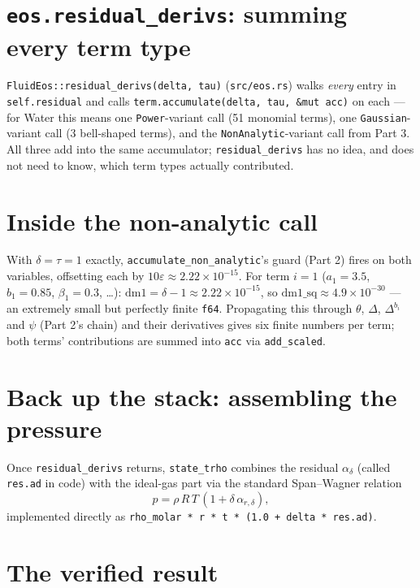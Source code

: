 \documentclass[11pt]{article}
\begin{document}
\section{\texttt{eos.residual\_derivs}: summing every term type}

\texttt{FluidEos::residual\_derivs(delta, tau)} (\texttt{src/eos.rs}) walks
\emph{every} entry in \texttt{self.residual} and calls
\texttt{term.accumulate(delta, tau, \&mut acc)} on each — for Water this
means one \texttt{Power}-variant call (51 monomial terms), one
\texttt{Gaussian}-variant call (3 bell-shaped terms), and the
\texttt{NonAnalytic}-variant call from Part 3. All three add into the same
accumulator; \texttt{residual\_derivs} has no idea, and does not need to
know, which term types actually contributed.

\section{Inside the non-analytic call}

With $\delta=\tau=1$ exactly, \texttt{accumulate\_non\_analytic}'s guard
(Part 2) fires on both variables, offsetting each by $10\varepsilon \approx
2.22\times10^{-15}$. For term $i=1$ ($a_1=3.5$, $b_1=0.85$,
$\beta_1=0.3$, \ldots): $\mathrm{dm1} = \delta - 1 \approx 2.22\times
10^{-15}$, so $\mathrm{dm1\_sq} \approx 4.9\times10^{-30}$ — an extremely
small but perfectly finite \texttt{f64}. Propagating this through $\theta$,
$\Delta$, $\Delta^{b_i}$ and $\psi$ (Part 2's chain) and their derivatives
gives six finite numbers per term; both terms' contributions are summed into
\texttt{acc} via \texttt{add\_scaled}.

\section{Back up the stack: assembling the pressure}

Once \texttt{residual\_derivs} returns, \texttt{state\_trho} combines the
residual $\alpha_\delta$ (called \texttt{res.ad} in code) with the ideal-gas
part via the standard Span--Wagner relation
\[
  p = \rho\, R\, T\, (1 + \delta\, \alpha_{r,\delta}),
\]
implemented directly as \texttt{rho\_molar * r * t * (1.0 + delta * res.ad)}.

\section{The verified result}
\end{document}
